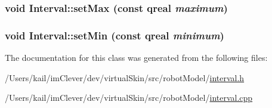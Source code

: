 \label{class_robot_model_1_1_interval_a15ffb7f16e3bad02073761ecd23d9695}
\hypertarget{class_robot_model_1_1_interval_a7deeccee610088a7aebef94919fd6f36}{
\subsubsection[{setMax}]{\setlength{\rightskip}{0pt plus 5cm}void Interval::setMax (const qreal {\em maximum})}}
\label{class_robot_model_1_1_interval_a7deeccee610088a7aebef94919fd6f36}
\hypertarget{class_robot_model_1_1_interval_a093471bdcba90e074543fb2781287145}{
\subsubsection[{setMin}]{\setlength{\rightskip}{0pt plus 5cm}void Interval::setMin (const qreal {\em minimum})}}
\label{class_robot_model_1_1_interval_a093471bdcba90e074543fb2781287145}


The documentation for this class was generated from the following files:\begin{DoxyCompactItemize}
\item 
/Users/kail/imClever/dev/virtualSkin/src/robotModel/\hyperlink{interval_8h}{interval.h}\item 
/Users/kail/imClever/dev/virtualSkin/src/robotModel/\hyperlink{interval_8cpp}{interval.cpp}\end{DoxyCompactItemize}
